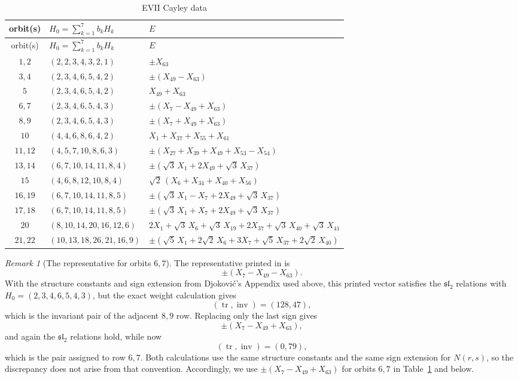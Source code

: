 \documentclass[11pt,reqno]{amsart}
\numberwithin{equation}{section}
\theoremstyle{definition}
\theoremstyle{remark}
\newtheorem{remark}[theorem]{Remark}
\begin{document}
\begingroup
\small
\renewcommand{\arraystretch}{1.08}
\begin{longtable}{@{}c >{\raggedright\arraybackslash}p{}
 >{\raggedright\arraybackslash}p{}@{}}
\caption{EVII Cayley data}\label{evii:tab:cayley-data}\\
\toprule
orbit(s)&$H_0=\sum_{k=1}^7b_kH_k$&$E$\\
\midrule
\endfirsthead
\toprule
orbit(s)&$H_0=\sum_{k=1}^7b_kH_k$&$E$\\
\midrule
\endhead
$1,2$ & $(2,2,3,4,3,2,1)$ & $\pm X_{63}$\\
$3,4$ & $(2,3,4,6,5,4,2)$ & $\pm(X_{49}-X_{63})$\\
$5$ & $(2,3,4,6,5,4,2)$ & $X_{49}+X_{63}$\\
$6,7$ & $(2,3,4,6,5,4,3)$ & $\pm(X_7-X_{49}+X_{63})$\\
$8,9$ & $(2,3,4,6,5,4,3)$ & $\pm(X_7+X_{49}+X_{63})$\\
$10$ & $(4,4,6,8,6,4,2)$ & $X_1+X_{37}+X_{55}+X_{61}$\\
$11,12$ & $(4,5,7,10,8,6,3)$ &
 $\pm(X_{27}+X_{39}+X_{49}+X_{53}-X_{54})$\\
$13,14$ & $(6,7,10,14,11,8,4)$ &
 $\pm(\sqrt3\,X_1+2X_{49}+\sqrt3\,X_{37})$\\
$15$ & $(4,6,8,12,10,8,4)$ &
 $\sqrt2\,(X_6+X_{34}+X_{40}+X_{56})$\\
$16,19$ & $(6,7,10,14,11,8,5)$ &
 $\pm(\sqrt3\,X_1-X_7+2X_{49}+\sqrt3\,X_{37})$\\
$17,18$ & $(6,7,10,14,11,8,5)$ &
 $\pm(\sqrt3\,X_1+X_7+2X_{49}+\sqrt3\,X_{37})$\\
$20$ & $(8,10,14,20,16,12,6)$ &
 $2X_1+\sqrt3\,X_6+\sqrt3\,X_{19}+2X_{37}+\sqrt3\,X_{40}+\sqrt3\,X_{41}$\\
$21,22$ & $(10,13,18,26,21,16,9)$ &
 $\pm(\sqrt5\,X_1+2\sqrt2\,X_6+3X_7+\sqrt5\,X_{37}+2\sqrt2\,X_{40})$\\
\bottomrule
\end{longtable}
\endgroup

\begin{remark}[The representative for orbits $6,7$]
\label{evii:rem:djokovic-sign}
The representative printed in \cite[Table~6]{Djokovic} is
\[
  \pm(X_7-X_{49}-X_{63}).
\]
With the structure constants and sign extension from Djokovi\'c's Appendix
used above, this printed vector satisfies the $\mathfrak{sl}_2$ relations
with $H_0=(2,3,4,6,5,4,3)$, but the exact weight calculation gives
\[
  (\operatorname{tr},\operatorname{inv})=(128,47),
\]
which is the invariant pair of the adjacent $8,9$ row.  Replacing only the
last sign gives
\[
  \pm(X_7-X_{49}+X_{63}),
\]
and again the $\mathfrak{sl}_2$ relations hold, while now
\[
  (\operatorname{tr},\operatorname{inv})=(0,79),
\]
which is the pair assigned to row $6,7$.  Both calculations use the same
structure constants and the same sign extension for $N(r,s)$, so the
discrepancy does not arise from that convention.
Accordingly, we use $\pm(X_7-X_{49}+X_{63})$ for orbits $6,7$ in
Table~\ref{evii:tab:cayley-data} and below.
\end{remark}
\end{document}
